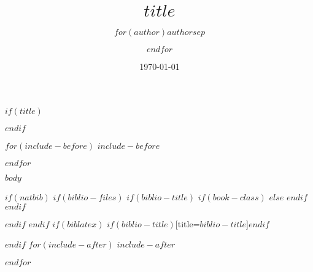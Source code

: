 \documentclass[10pt,a4j,dvipdfmx]{jarticle}
\title{$title$}
\author{$for(author)$$author$$sep$ \and $endfor$}
\date{\today}
\makeatletter
\renewcommand{\maketitle}{
\begin{center}
  {\LARGE\textbf \@title{}}
\end{center}
}
\makeatother
\begin{document}
$if(title)$
\maketitle
\thispagestyle{empty}
$endif$

$for(include-before)$
$include-before$

$endfor$

$body$

$if(natbib)$
$if(biblio-files)$
$if(biblio-title)$
$if(book-class)$
\renewcommand\bibname{$biblio-title$}
$else$
\renewcommand\refname{$biblio-title$}
$endif$
$endif$


$endif$
$endif$
$if(biblatex)$
\printbibliography$if(biblio-title)$[title=$biblio-title$]$endif$

$endif$
$for(include-after)$
$include-after$

$endfor$
\end{document}
